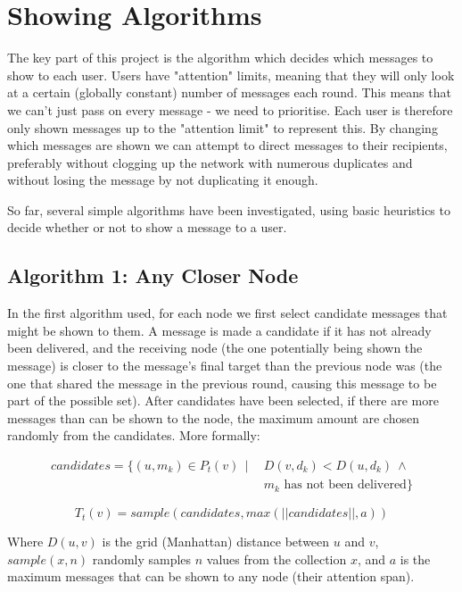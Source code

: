 \documentclass[bsc,frontabs,twoside,singlespacing,parskip,deptreport]{infthesis}     %
\begin{document}
\section{Showing Algorithms}
The key part of this project is the algorithm which decides which messages to show to each user. Users have "attention" limits, meaning that they will only look at a certain (globally constant) number of messages each round. This means that we can't just pass on every message - we need to prioritise. Each user is therefore only shown messages up to the "attention limit" to represent this. By changing which messages are shown we can attempt to direct messages to their recipients, preferably without clogging up the network with numerous duplicates and without losing the message by not duplicating it enough.

So far, several simple algorithms have been investigated, using basic heuristics to decide whether or not to show a message to a user.

\subsection{Algorithm 1: Any Closer Node}
In the first algorithm used, for each node we first select candidate messages that might be shown to them. A message is made a candidate if it has not already been delivered, and the receiving node (the one potentially being shown the message) is closer to the message's final target than the previous node was (the one that shared the message in the previous round, causing this message to be part of the possible set). After candidates have been selected, if there are more messages than can be shown to the node, the maximum amount are chosen randomly from the candidates. More formally:

\begin{equation}
\begin{split}
candidates = \{ (u, m_{k}) \in P_{t}(v) \:\: | \:\: & D(v, d_{k}) < D(u, d_{k}) \: \wedge \\
& m_{k} \mbox{ has not been delivered} \}
\end{split}
\end{equation}

\begin{equation}
T_{t}(v) = sample(candidates, max(||candidates||, a))
\end{equation}

Where $D(u, v)$ is the grid (Manhattan) distance between $u$ and $v$, $sample(x, n)$ randomly samples $n$ values from the collection $x$, and $a$ is the maximum messages that can be shown to any node (their attention span).
\end{document}
